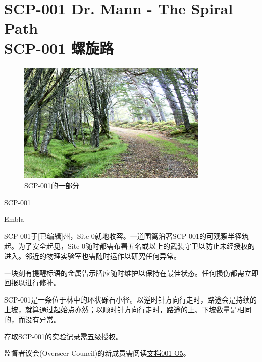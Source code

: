\chapter[SCP-001 螺旋路]{
	SCP-001 Dr. Mann - The Spiral Path \\
	SCP-001 螺旋路
}

\label{chap:SCP-001.the.spiral.path}

\begin{figure}[H]
	\centering
	\includegraphics[width=0.5\linewidth]{images/SCP.001.the.spiral.path.jpg}
	\caption*{SCP-001的一部分}
\end{figure}

SCP-001

Embla

SCP-001于[已编辑]州，Site 0就地收容。一道围篱沿著SCP-001的可观察半径筑起。为了安全起见，Site 0随时都需布署五名或以上的武装守卫以防止未经授权的进入。邻近的物理实验室也需随时运作以研究任何异常。

一块刻有提醒标语的金属告示牌应随时维护以保持在最佳状态。任何损伤都需立即回报以进行修补。

SCP-001是一条位于林中的环状砾石小径。以逆时针方向行走时，路途会是持续的上坡，就算通过起始点亦然；以顺时针方向行走时，路途的上、下坡数量是相同的，而没有异常。

存取SCP-001的实验记录需五级授权。

监督者议会(Overseer Council)的新成员需阅读\hyperref[chap:doc.001-05]{文档001-O5}。